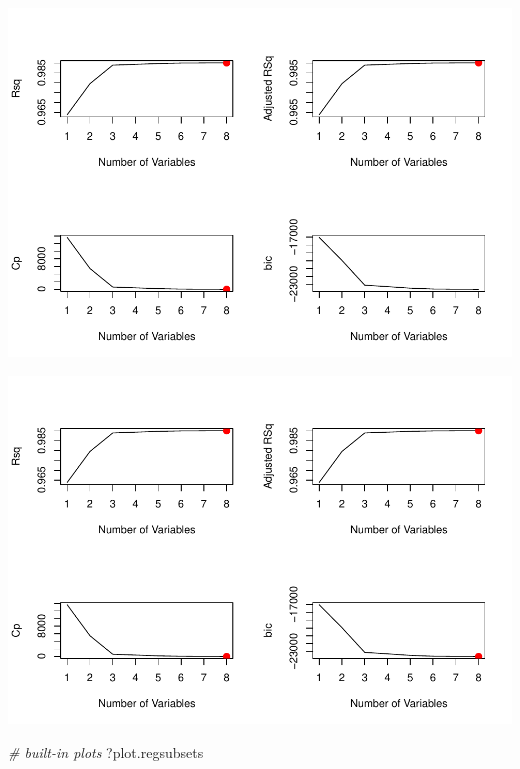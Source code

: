 \documentclass[]{article}
\newenvironment{Shaded}{\begin{snugshade}}{\end{snugshade}}
\newcommand{\KeywordTok}[1]{\textcolor[rgb]{0.13,0.29,0.53}{\textbf{#1}}}
\newcommand{\DataTypeTok}[1]{\textcolor[rgb]{0.13,0.29,0.53}{#1}}
\newcommand{\DecValTok}[1]{\textcolor[rgb]{0.00,0.00,0.81}{#1}}
\newcommand{\StringTok}[1]{\textcolor[rgb]{0.31,0.60,0.02}{#1}}
\newcommand{\CommentTok}[1]{\textcolor[rgb]{0.56,0.35,0.01}{\textit{#1}}}
\newcommand{\OperatorTok}[1]{\textcolor[rgb]{0.81,0.36,0.00}{\textbf{#1}}}
\newcommand{\NormalTok}[1]{#1}
\begin{document}
\includegraphics{TSLproject_files/figure-latex/unnamed-chunk-17-4.pdf}

\begin{Shaded}
\end{Shaded}

\includegraphics{TSLproject_files/figure-latex/unnamed-chunk-17-5.pdf}

\begin{Shaded}
\begin{Highlighting}[]
\CommentTok{# built-in plots}
\NormalTok{?plot.regsubsets}
\end{Highlighting}
\end{Shaded}
\end{document}
